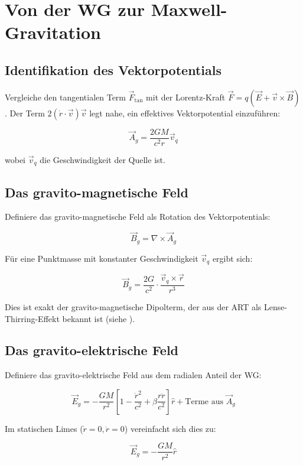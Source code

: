 \section{Von der WG zur Maxwell-Gravitation}
\label{sec:wg_zu_mg}

\subsection{Identifikation des Vektorpotentials}
\label{sub:vektorpotential_mg}

Vergleiche den tangentialen Term \( \vec{F}_{\text{tan}} \) mit der Lorentz-Kraft \( \vec{F} = q(\vec{E} + \vec{v} \times \vec{B}) \). Der Term \( 2(\dot{r} \cdot \vec{v}) \vec{v} \) legt nahe, ein effektives Vektorpotential einzuführen:

\[
\vec{A}_g = \frac{2GM}{c^2 r} \vec{v}_q
\]

wobei \( \vec{v}_q \) die Geschwindigkeit der Quelle ist.

\subsection{Das gravito-magnetische Feld}
\label{sub:gravito_magnetisch}

Definiere das gravito-magnetische Feld als Rotation des Vektorpotentials:

\[
\vec{B}_g = \nabla \times \vec{A}_g
\]

Für eine Punktmasse mit konstanter Geschwindigkeit \( \vec{v}_q \) ergibt sich:

\[
\vec{B}_g = \frac{2G}{c^2} \cdot \frac{\vec{v}_q \times \vec{r}}{r^3}
\]

Dies ist exakt der gravito-magnetische Dipolterm, der aus der ART als Lense-Thirring-Effekt bekannt ist (siehe \cite{Lense1918}).

\subsection{Das gravito-elektrische Feld}
\label{sub:gravito_elektrisch}

Definiere das gravito-elektrische Feld aus dem radialen Anteil der WG:

\[
\vec{E}_g = -\frac{GM}{r^2} \left[ 1 - \frac{\dot{r}^2}{c^2} + \beta \frac{r\ddot{r}}{c^2} \right] \hat{r} + \text{Terme aus } \vec{A}_g
\]

Im statischen Limes (\( \dot{r} = 0, \ddot{r} = 0 \)) vereinfacht sich dies zu:

\[
\vec{E}_g = -\frac{GM}{r^2} \hat{r}
\]

